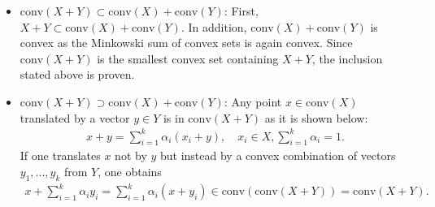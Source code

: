 \documentclass[fontsize=11pt, paper=a4]{scrartcl}
\begin{document}
\begin{itemize}
    \item $\mathrm{conv}(X+Y) \subset \mathrm{conv}(X) + \mathrm{conv}(Y)$: First, $X+Y \subset \mathrm{conv}(X) + \mathrm{conv}(Y)$. In addition, $\mathrm{conv}(X) + \mathrm{conv}(Y)$ is convex as the Minkowski sum of convex sets is again convex. Since $\mathrm{conv}(X+Y)$ is the smallest convex set containing $X+Y$, the inclusion stated above is proven.
    
    \item $\mathrm{conv}(X+Y) \supset \mathrm{conv}(X) + \mathrm{conv}(Y)$: Any point $x \in \mathrm{conv}(X)$ translated by a vector $y \in Y$ is in $\mathrm{conv}(X+Y)$ as it is shown below: 
    \begin{align*}
        x + y = \sum_{i=1}^k \alpha_i (x_i + y),
        \quad x_i \in X, \sum^k_{i=1} \alpha_i = 1.
    \end{align*}
    If one translates $x$ not by $y$ but instead by a convex combination of vectors $y_1,...,y_k$ from $Y$, one obtains 
    \begin{align*}
        x + \sum_{i=1}^k \alpha_i y_i 
        = \sum_{i=1}^k \alpha_i(x + y_i) 
        \in \mathrm{conv}\left(\mathrm{conv}(X+Y)\right) 
        = \mathrm{conv}(X+Y).
    \end{align*}
\end{itemize}


\end{document}
